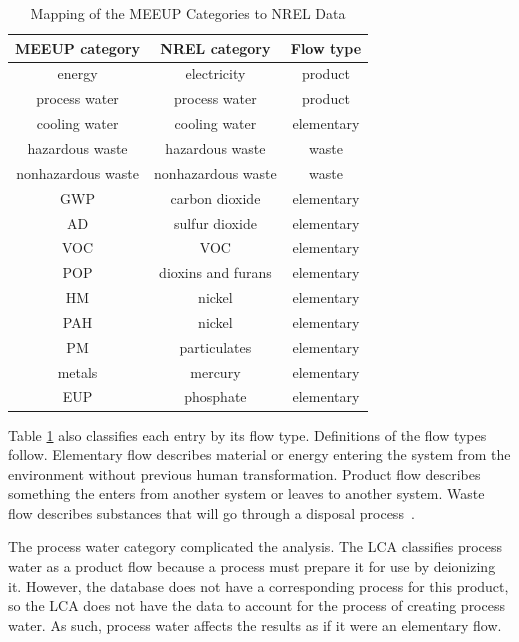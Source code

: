\documentclass[final,journal,10pt,letterpaper,oneside,twocolumn,compsoc]%
{IEEEtran}
\begin{document}
\begin{table}[htbp]
\caption{Mapping of the MEEUP Categories to NREL Data}
\centering
\begin{tabular}{|c|c||c|}
  \hline
  MEEUP category      & NREL category       & Flow type \\
  \hline
  energy              & electricity         & product \\
  process water       & process water       & product \\
  cooling water       & cooling water       & elementary \\
  hazardous waste     & hazardous waste     & waste \\
  nonhazardous waste & nonhazardous waste & waste \\
  GWP                 & carbon dioxide      & elementary \\
  AD                  & sulfur dioxide      & elementary \\
  VOC                 & VOC                 & elementary \\
  POP                 & dioxins and furans  & elementary \\
  HM                  & nickel              & elementary \\
  PAH                 & nickel              & elementary \\
  PM                  & particulates        & elementary \\
  metals              & mercury             & elementary \\
  EUP                 & phosphate           & elementary \\
  \hline
\end{tabular}
\label{tab:2}
\end{table}


Table \ref{tab:2} also classifies each entry by its flow type. Definitions of
the flow types follow. Elementary flow describes material or energy entering
the system from the environment without previous human transformation. Product
flow describes something the enters from another system or leaves to another
system. Waste flow describes substances that will go through a disposal process~\cite{14044}.

The process water category complicated the analysis. The LCA classifies process
water as a product flow because a process must prepare it for use by deionizing
it. However, the database does not have a corresponding process for this
product, so the LCA does not have the data to account for the process of
creating process water. As such, process water affects the results as if it were
an elementary flow.
\end{document}
